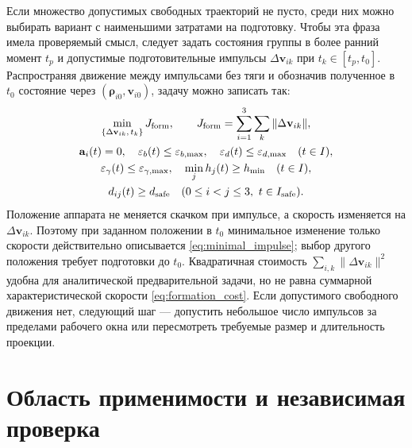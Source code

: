 \documentclass[a4paper,12pt]{article}
\begin{document}
Если множество допустимых свободных траекторий не пусто,
среди них можно выбирать вариант с наименьшими затратами
на подготовку. Чтобы эта фраза имела проверяемый смысл,
следует задать состояния группы в более ранний момент $t_p$
и допустимые подготовительные импульсы
$\Delta\mathbf v_{ik}$ при $t_k\in[t_p,t_0]$.
Распространяя движение между импульсами без тяги и
обозначив полученное в $t_0$ состояние через
$(\boldsymbol\rho_{i0},\mathbf v_{i0})$, задачу можно записать так:
\begin{equation}
\begin{gathered}
 \min_{\{\Delta\mathbf v_{ik},\,t_k\}}J_{\rm form},
 \qquad
 J_{\rm form}=\sum_{i=1}^3\sum_k\|\Delta\mathbf v_{ik}\|,\\
 \mathbf a_i(t)=0,\quad
 \varepsilon_b(t)\leq\varepsilon_{b,\max},\quad
 \varepsilon_d(t)\leq\varepsilon_{d,\max}\quad(t\in I),\\
 \varepsilon_\gamma(t)\leq\varepsilon_{\gamma,\max},
 \quad \min_j h_j(t)\geq h_{\min}\quad(t\in I),\\
 d_{ij}(t)\geq d_{\rm safe}
 \quad(0\leq i<j\leq3,\ t\in I_{\rm safe}).
\end{gathered}
\label{eq:formation_cost}
\end{equation}
Положение аппарата не меняется скачком при импульсе, а скорость
изменяется на $\Delta\mathbf v_{ik}$. Поэтому при заданном
положении в $t_0$ минимальное изменение только скорости
действительно описывается \eqref{eq:minimal_impulse};
выбор другого положения требует подготовки до $t_0$.
Квадратичная стоимость
$\sum_{i,k}\|\Delta\mathbf v_{ik}\|^2$ удобна для
аналитической предварительной задачи, но не равна суммарной
характеристической скорости \eqref{eq:formation_cost}.
Если допустимого свободного движения нет, следующий шаг ---
допустить небольшое число импульсов за пределами рабочего окна
или пересмотреть требуемые размер и длительность проекции.

\section{Область применимости и независимая проверка}
\end{document}
